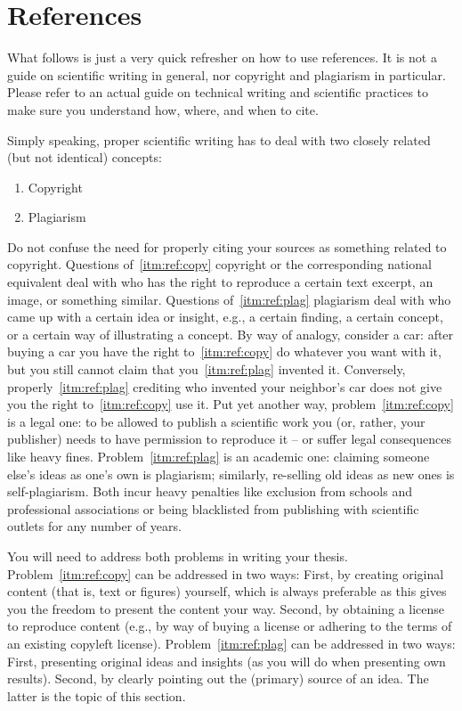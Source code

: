 \documentclass[]{ccs-thesis}
\begin{document}
\clearpage
\section{References}

What follows is just a very quick refresher on how to use references.
It is not a guide on scientific writing in general, nor copyright and plagiarism in particular.
Please refer to an actual guide on technical writing and scientific practices to make sure you understand how, where, and when to cite.

Simply speaking, proper scientific writing has to deal with two closely related (but not identical) concepts:
\begin{enumerate}[label=\alph*),ref=(\alph*)]
\item\label{itm:ref:copy}
Copyright
\item
Plagiarism\label{itm:ref:plag}
\end{enumerate}
Do not confuse the need for properly citing your sources as something related to copyright.
Questions of~\ref{itm:ref:copy} copyright or the corresponding national equivalent deal with who has the right to reproduce a certain text excerpt, an image, or something similar.
Questions of~\ref{itm:ref:plag} plagiarism deal with who came up with a certain idea or insight, e.g., a certain finding, a certain concept, or a certain way of illustrating a concept.
By way of analogy, consider a car: after buying a car you have the right to~\ref{itm:ref:copy} do whatever you want with it, but you still cannot claim that you~\ref{itm:ref:plag} invented it.
Conversely, properly~\ref{itm:ref:plag} crediting who invented your neighbor's car does not give you the right to~\ref{itm:ref:copy} use it.
Put yet another way, problem~\ref{itm:ref:copy} is a legal one: to be allowed to publish a scientific work you (or, rather, your publisher) needs to have permission to reproduce it -- or suffer legal consequences like heavy fines.
Problem~\ref{itm:ref:plag} is an academic one: claiming someone else's ideas as one's own is plagiarism; similarly, re-selling old ideas as new ones is self-plagiarism.
Both incur heavy penalties like exclusion from schools and professional associations or being blacklisted from publishing with scientific outlets for any number of years.

You will need to address both problems in writing your thesis.
Problem~\ref{itm:ref:copy} can be addressed in two ways:
First, by creating original content (that is, text or figures) yourself, which is always preferable as this gives you the freedom to present the content your way.
Second, by obtaining a license to reproduce content (e.g., by way of buying a license or adhering to the terms of an existing copyleft license).
Problem~\ref{itm:ref:plag} can be addressed in two ways:
First, presenting original ideas and insights (as you will do when presenting own results).
Second, by clearly pointing out the (primary) source of an idea.
The latter is the topic of this section.
\end{document}
